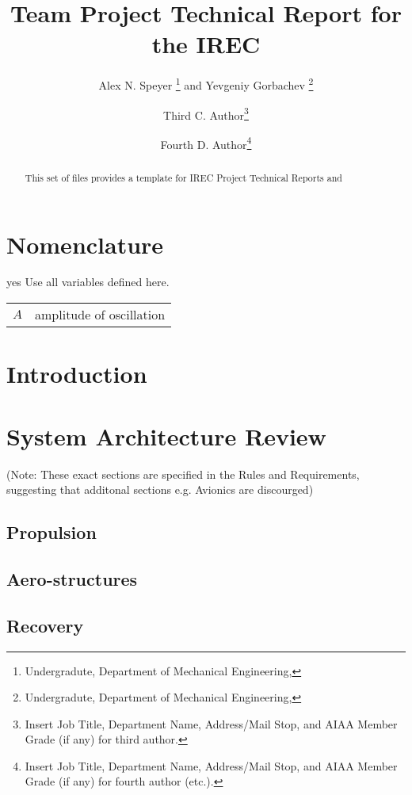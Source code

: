 \documentclass[conf]{new-aiaa}
\title{Team \irecteam{} Project Technical Report for the \irecyear{} IREC}
\author{
	Alex N. Speyer
	\footnote{Undergradute, Department of Mechanical Engineering, \RITAddr} and 
	Yevgeniy Gorbachev
	\footnote{Undergradute, Department of Mechanical Engineering, \RITAddr}
}
\affil{\RIT, \RITAddr}
\author{Third C. Author\footnote{Insert Job Title, Department Name, Address/Mail Stop, and AIAA Member Grade (if any) for third author.}}
\affil{\RIT, \RITAddr}
\author{Fourth D. Author\footnote{Insert Job Title, Department Name, Address/Mail Stop, and AIAA Member Grade (if any) for fourth author (etc.).}}
\affil{\RIT, \RITAddr}
\def\WIP{yes}
\begin{document}
\maketitle

\begin{abstract}
	This set of files provides a template for IREC Project Technical Reports and 

	\AbstractDescription{}
\end{abstract}

\section{Nomenclature}
\ifdefined\WIP
Use all variables defined here.
\fi

{\renewcommand\arraystretch{1.0}
\noindent\begin{longtable*}{@{}l @{\quad=\quad} l@{}}
	\(A\) & amplitude of oscillation \\
\end{longtable*}}

\pagebreak
\section{Introduction}
\begin{quotation}
\IntroductionDescription
\end{quotation}

\section{System Architecture Review}
\begin{quotation}
\SAODescription
\end{quotation}

(Note: These exact sections are specified in the Rules and Requirements,
suggesting that additonal sections e.g. Avionics are discourged)

\subsection{Propulsion}

\subsection{Aero-structures}

\subsection{Recovery}
\end{document}
